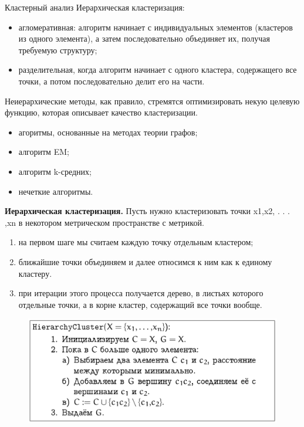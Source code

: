 \documentclass{beamer}
\begin{document}
\begin{frame}{Кластерный анализ}
Иерархическая кластеризация:
\begin{itemize}
\item агломеративная: алгоритм начинает с индивидуальных элементов (кластеров из одного элемента), а затем последовательно объединяет их, получая требуемую структуру; 
\item разделительная, когда алгоритм начинает с одного кластера, содержащего все точки, а потом последовательно делит его на части.
\end{itemize}
Неиерархические методы, как правило, стремятся оптимизировать некую целевую функцию, которая описывает качество кластеризации. 
\begin{itemize}
\item агоритмы, основанные на методах теории графов;
\item алгоритм EM;
\item алгоритм k-средних;
\item нечеткие алгоритмы.
\end{itemize}
\end{frame}

\begin{frame}
\textbf{Иерархическая кластеризация.} Пусть нужно кластеризовать точки x1,x2, . . . ,xn в некотором метрическом пространстве с метрикой.
\begin{enumerate}
\item на первом шаге мы считаем каждую точку отдельным кластером;
\item ближайшие точки объединяем и далее относимся к ним как к единому кластеру.
\item при итерации этого процесса получается дерево, в листьях которого  отдельные точки, а в корне  кластер, содержащий все точки вообще.
\end{enumerate}
\begin{figure}[h]
\centering
\includegraphics[scale=0.4]{images/lec07-pic16.png}
\end{figure}
\end{frame}
\end{document}
